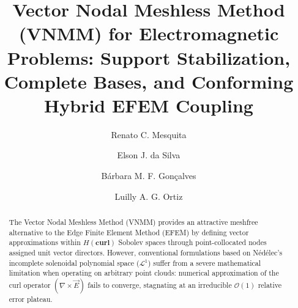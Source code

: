 \documentclass[preprint,12pt]{elsarticle}
\begin{document}
\begin{frontmatter}



\title{Vector Nodal Meshless Method (VNMM) for Electromagnetic Problems: Support Stabilization, Complete Bases, and Conforming Hybrid EFEM Coupling}



\author[ufmg]{Renato C. Mesquita}
\author[ufmg]{Elson J. da Silva}
\author[ufmg]{Bárbara M. F. Gonçalves}
\author[ufmg]{Luilly A. G. Ortiz}



\begin{abstract}
The Vector Nodal Meshless Method (VNMM) provides an attractive meshfree alternative to the Edge Finite Element Method (EFEM) by defining vector approximations within $H(\mathbf{curl})$ Sobolev spaces through point-collocated nodes assigned unit vector directors. However, conventional formulations based on Nédélec's incomplete solenoidal polynomial space ($\mathcal{L}^1$) suffer from a severe mathematical limitation when operating on arbitrary point clouds: numerical approximation of the curl operator $(\nabla \times \vec{E})$ fails to converge, stagnating at an irreducible $\mathcal{O}(1)$ relative error plateau. 


\end{abstract}
\end{frontmatter}
\end{document}
